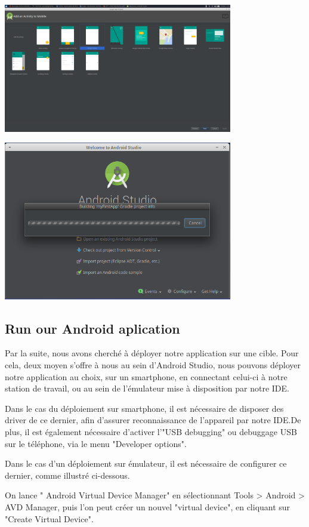 \documentclass[french,a4paper,12pt]{report}
\begin{document}
\includegraphics[width=10cm]{4Activity.png}

\includegraphics[width=10cm]{5bUIDaPP.png}

\subsection{Run our  Android aplication}
Par la suite, nous avons cherché à déployer notre application sur une cible.
Pour cela, deux moyen s'offre à nous au sein d'Android Studio, nous pouvons
déployer notre application au choix, sur un smartphone, en connectant celui-ci
à notre station de travail, ou au sein de l'émulateur mise à disposition par
notre IDE.

Dans le cas du déploiement sur smartphone, il est nécessaire de disposer des
driver de ce dernier, afin d'assurer reconnaissance de l'appareil par notre
IDE.De plus, il est également nécessaire d'activer l'"USB debugging" ou debuggage USB
sur le téléphone, via le menu "Developer options".

Dans le cas d'un déploiement sur émulateur, il est nécessaire de configurer ce
dernier, comme illustré ci-dessous.

On lance " Android Virtual Device Manager" en sélectionnant Tools > Android > AVD Manager,
puis l'on peut créer un nouvel "virtual device", en cliquant sur "Create Virtual Device".
\end{document}
